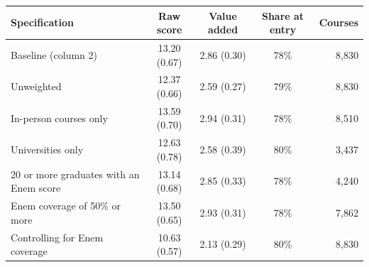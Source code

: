 \begin{tabular}{lcccr}
\toprule
Specification & Raw score & Value added & Share at entry & Courses \\
\midrule
Baseline (column 2) & 13.20 (0.67) & 2.86 (0.30) & 78\% & 8{,}830 \\
Unweighted & 12.37 (0.66) & 2.59 (0.27) & 79\% & 8{,}830 \\
In-person courses only & 13.59 (0.70) & 2.94 (0.31) & 78\% & 8{,}510 \\
Universities only & 12.63 (0.78) & 2.58 (0.39) & 80\% & 3{,}437 \\
20 or more graduates with an Enem score & 13.14 (0.68) & 2.85 (0.33) & 78\% & 4{,}240 \\
Enem coverage of 50\% or more & 13.50 (0.65) & 2.93 (0.31) & 78\% & 7{,}862 \\
Controlling for Enem coverage & 10.63 (0.57) & 2.13 (0.29) & 80\% & 8{,}830 \\
\bottomrule
\end{tabular}